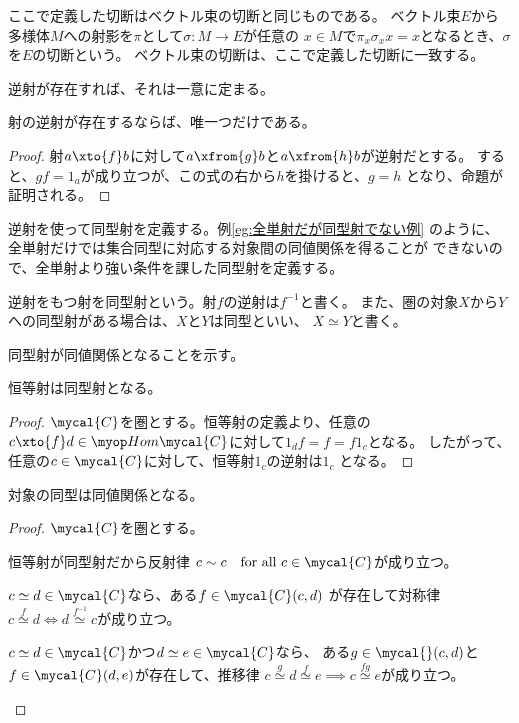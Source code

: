 	ここで定義した切断はベクトル束の切断と同じものである。
	ベクトル束$E$から多様体$M$への射影を$\pi$として$\sigma:M\to E$が任意の
	$x\in M$で$\pi_x\sigma_xx=x$となるとき、$\sigma$を$E$の切断という。
	ベクトル束の切断は、ここで定義した切断に一致する。

	逆射が存在すれば、それは一意に定まる。

	\begin{proposition}[逆射の一意性]\label{prop:逆射の一意性} %
		射の逆射が存在するならば、唯一つだけである。
	\end{proposition} %
	\begin{proof} %
		射$a\xto{f}b$に対して$a\xfrom{g}b$と$a\xfrom{h}b$が逆射だとする。
		すると、$gf=1_a$が成り立つが、この式の右から$h$を掛けると、$g=h$
		となり、命題が証明される。
	\end{proof} %

	逆射を使って同型射を定義する。例\ref{eg:全単射だが同型射でない例}
	のように、全単射だけでは集合同型に対応する対象間の同値関係を得ることが
	できないので、全単射より強い条件を課した同型射を定義する。

	\begin{definition}[同型射]\label{def:同型射} %
		逆射をもつ射を同型射という。射$f$の逆射は$f^{-1}$と書く。
		また、圏の対象$X$から$Y$への同型射がある場合は、$X$と$Y$は同型といい、
		$X\simeq Y$と書く。
	\end{definition} %

	同型射が同値関係となることを示す。

	\begin{proposition}[恒等射は同型射]\label{prop:恒等射は同型射} %
		恒等射は同型射となる。
	\end{proposition} %
	\begin{proof} %
		$\mycal{C}$を圏とする。恒等射の定義より、任意の
		$c\xto{f}d\in\Hom\mycal{C}$に対して$1_df=f=f1_c$となる。
		したがって、任意の$c\in\mycal{C}$に対して、恒等射$1_c$の逆射は$1_c$
		となる。
	\end{proof} %

	\begin{proposition}[同型は同値関係]\label{prop:同型は同値関係} %
		対象の同型は同値関係となる。
	\end{proposition} %
	\begin{proof} %
		$\mycal{C}$を圏とする。
		\begin{description}\setlength{\itemsep}{-1mm} %
			\item[反射律] 恒等射が同型射だから反射律
			$c\sim c \quad\text{for all }c\in\mycal{C}$が成り立つ。
			\item[対称律] $c\simeq d\in\mycal{C}$なら、ある$f\in\mycal{C}(c,d)$
			が存在して対称律
			$c\overset{f}{\simeq}d \iff d\overset{f^{-1}}{\simeq}c$が成り立つ。
			\item[推移律] $c\simeq d\in\mycal{C}$かつ$d\simeq e\in\mycal{C}$なら、
			ある$g\in\mycal{}(c,d)$と$f\in\mycal{C}(d,e)$が存在して、推移律
			$c\overset{g}{\simeq}d\overset{f}{\simeq}e
			\implies c\overset{fg}{\simeq}e$が成り立つ。
		\end{description} %
	\end{proof} %

